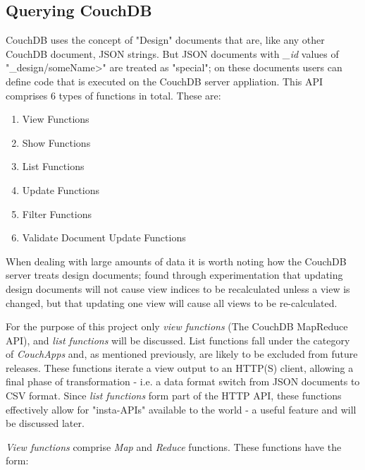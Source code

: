 
\subsection{Querying CouchDB}

CouchDB uses the concept of "Design" documents that are, like any other CouchDB document, JSON strings. But JSON documents with \textit{\_id} values of "\_design/someName>" are treated as "special"; on these documents users can define code that is executed on the CouchDB server appliation. This API comprises 6 types of functions in total. These are:

\begin{enumerate}
    \item View Functions
    \item Show Functions
    \item List Functions
    \item Update Functions
    \item Filter Functions
    \item Validate Document Update Functions
\end{enumerate}

When dealing with large amounts of data it is worth noting how the CouchDB server treats design documents; \cite{Sharma2014} found through experimentation that updating design documents will not cause view indices to be recalculated unless a view is changed, but that updating one view will cause all views to be re-calculated.

For the purpose of this project only \textit{view functions} (The CouchDB MapReduce API), and \textit{list functions} will be discussed. List functions fall under the category of \textit{CouchApps} and, as mentioned previously, are likely to be excluded from future releases. These functions iterate a view output to an HTTP(S) client, allowing a final phase of transformation - i.e. a data format switch from JSON documents to CSV format. Since \textit{list functions} form part of the HTTP API, these functions effectively allow for "insta-APIs" available to the world - a useful feature and will be discussed later.

\textit{View functions} comprise \textit{Map} and \textit{Reduce} functions. These functions have the form:

